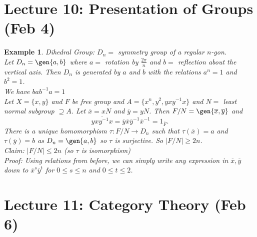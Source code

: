 \documentclass[a4paper,12pt]{article}
\newtheorem{eg}[thm]{Example}
\begin{document}
\section{Lecture 10: Presentation of Groups (Feb 4)}
\begin{eg}
    Dihedral Group: $D_n=$ symmetry group of a regular $n$-gon. \\
    Let $D_n=\gen{a,b}$ where $a=$ rotation by $\frac{2\pi}{n}$ and $b=$ reflection about the vertical axis. Then $D_n$ is generated by $a$ and $b$ with the relations $a^n=1$ and $b^2=1$. \\
    We have $bab^{-1}a=1$ \\
    Let $X= \{x,y\}$ and $F$ be free group and $A= \{x^n, y^2, yxy^{-1}x\}$ and $N=$ least normal subgroup $\supseteq A$. Let $\overline{x}=xN$ and $\overline{y}=yN$. Then $F/N=\gen{\overline{x},\overline{y}}$ and \[
    \overline{yxy^{-1}x}=\overline{y}\overline{x}\overline{y}^{-1}\overline{x}^{-1}=1_{\overline{F}}
    .\] 
    There is a unique homomorphism $\tau:F/N\to D_n$ such that $\tau(\overline{x})=a$ and $\tau(\overline{y})=b$ as $D_n=\gen{a,b}$ so $\tau$ is surjective. So $|F/N|\geq 2n$. \\
    Claim: $|F/N|\leq 2n$ (so $\tau$ is isomorphism)\\
    Proof: Using relations from before, we can simply write any expression in $\overline{x},\overline{y}$ down to $\overline{x}^s\overline{y}^t$ for $0\leq s \leq n$ and $0\leq t \leq 2$. 
\end{eg}
\newpage
\section{Lecture 11: Category Theory (Feb 6)}
\end{document}

